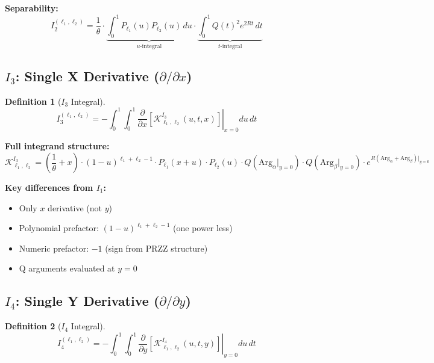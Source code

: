 \documentclass[11pt]{article}
\newtheorem{definition}{Definition}
\begin{document}
\textbf{Separability:}
\begin{equation}
I_2^{(\ell_1,\ell_2)} = \frac{1}{\theta} \cdot \underbrace{\int_0^1 P_{\ell_1}(u) P_{\ell_2}(u) \, du}_{\text{$u$-integral}} \cdot \underbrace{\int_0^1 Q(t)^2 e^{2Rt} \, dt}_{\text{$t$-integral}}
\end{equation}

\subsection{$I_3$: Single X Derivative ($\partial/\partial x$)}

\begin{definition}[$I_3$ Integral]
\begin{equation}
\boxed{
I_3^{(\ell_1,\ell_2)} = -\int_0^1 \int_0^1 \left.\frac{\partial}{\partial x}\left[\mathcal{K}^{I_3}_{\ell_1,\ell_2}(u,t,x)\right]\right|_{x=0} du\, dt
}
\end{equation}
\end{definition}

\textbf{Full integrand structure:}
\begin{equation}
\mathcal{K}^{I_3}_{\ell_1,\ell_2} = \left(\frac{1}{\theta} + x\right) \cdot (1-u)^{\ell_1+\ell_2-1} \cdot P_{\ell_1}(x+u) \cdot P_{\ell_2}(u) \cdot Q(\text{Arg}_\alpha|_{y=0}) \cdot Q(\text{Arg}_\beta|_{y=0}) \cdot e^{R(\text{Arg}_\alpha+\text{Arg}_\beta)|_{y=0}}
\end{equation}

\textbf{Key differences from $I_1$:}
\begin{itemize}
\item Only $x$ derivative (not $y$)
\item Polynomial prefactor: $(1-u)^{\ell_1+\ell_2-1}$ (one power less)
\item Numeric prefactor: $-1$ (sign from PRZZ structure)
\item Q arguments evaluated at $y=0$
\end{itemize}

\subsection{$I_4$: Single Y Derivative ($\partial/\partial y$)}

\begin{definition}[$I_4$ Integral]
\begin{equation}
\boxed{
I_4^{(\ell_1,\ell_2)} = -\int_0^1 \int_0^1 \left.\frac{\partial}{\partial y}\left[\mathcal{K}^{I_4}_{\ell_1,\ell_2}(u,t,y)\right]\right|_{y=0} du\, dt
}
\end{equation}
\end{definition}
\end{document}
